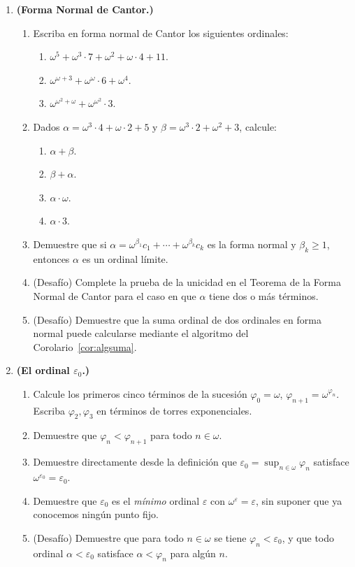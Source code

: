 \begin{enumerate}[leftmargin=2.5em, label=\textbf{\arabic*.}]
  \item \textbf{(Forma Normal de Cantor.)}
  \begin{enumerate}[label=(\alph*)]
    \item Escriba en forma normal de Cantor los siguientes ordinales:
    \begin{enumerate}[label=(\roman*)]
      \item $\omega^5 + \omega^3 \cdot 7 + \omega^2 + \omega \cdot 4 + 11$.
      \item $\omega^{\omega+3} + \omega^\omega \cdot 6 + \omega^4$.
      \item $\omega^{\omega^2 + \omega} + \omega^{\omega^2} \cdot 3$.
    \end{enumerate}
    \item Dados $\alpha = \omega^3 \cdot 4 + \omega \cdot 2 + 5$ y $\beta = \omega^3 \cdot 2 + \omega^2 + 3$, calcule:
    \begin{enumerate}[label=(\roman*)]
      \item $\alpha + \beta$.
      \item $\beta + \alpha$.
      \item $\alpha \cdot \omega$.
      \item $\alpha \cdot 3$.
    \end{enumerate}
    \item Demuestre que si $\alpha = \omega^{\beta_1}c_1 + \cdots + \omega^{\beta_k}c_k$ es la forma normal y $\beta_k \geq 1$, entonces $\alpha$ es un ordinal límite.
    \item (Desafío) Complete la prueba de la unicidad en el Teorema de la Forma Normal de Cantor para el caso en que $\alpha$ tiene dos o más términos.
    \item (Desafío) Demuestre que la suma ordinal de dos ordinales en forma normal puede calcularse mediante el algoritmo del Corolario~\ref{cor:algsuma}.
  \end{enumerate}

  \item \textbf{(El ordinal $\varepsilon_0$.)}
  \begin{enumerate}[label=(\alph*)]
    \item Calcule los primeros cinco términos de la sucesión $\varphi_0 = \omega$, $\varphi_{n+1} = \omega^{\varphi_n}$. Escriba $\varphi_2, \varphi_3$ en términos de torres exponenciales.
    \item Demuestre que $\varphi_n < \varphi_{n+1}$ para todo $n \in \omega$.
    \item Demuestre directamente desde la definición que $\varepsilon_0 = \sup_{n \in \omega} \varphi_n$ satisface $\omega^{\varepsilon_0} = \varepsilon_0$.
    \item Demuestre que $\varepsilon_0$ es el \emph{mínimo} ordinal $\varepsilon$ con $\omega^\varepsilon = \varepsilon$, sin suponer que ya conocemos ningún punto fijo.
    \item (Desafío) Demuestre que para todo $n \in \omega$ se tiene $\varphi_n < \varepsilon_0$, y que todo ordinal $\alpha < \varepsilon_0$ satisface $\alpha < \varphi_n$ para algún $n$.
  \end{enumerate}


\end{enumerate}
